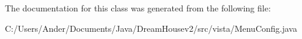 The documentation for this class was generated from the following file\+:\begin{DoxyCompactItemize}
\item 
C\+:/\+Users/\+Ander/\+Documents/\+Java/\+Dream\+Housev2/src/vista/Menu\+Config.\+java\end{DoxyCompactItemize}
